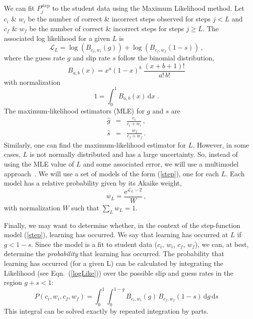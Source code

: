\documentclass[11pt,letterpaper]{article}
\begin{document}
%
We can fit $P_j^\mathrm{step} $ to the student data using the
Maximum Likelihood method.
Let $c_i$ \& $w_i$ be the number of correct \& incorrect steps observed
for steps $j<L$ and $c_f$ \& $w_f$ be the number of correct \& incorrect
steps for steps $j\ge L$.  The associated log likelihood for a given $L$ is
%
\begin{equation}
  \mathcal{L}_L  =  \log\left(B_{c_i,w_i}(g)\right) 
                  + \log\left(B_{c_f,w_f}(1-s) \right)  \, ,
		  \label{logLike}
\end{equation}
%
where the guess rate $g$ and slip rate $s$ follow the binomial distribution,
%
\begin{equation}
       B_{a,b}(x) = x^a (1-x)^b\; \frac{(x+b+1)!}{a!\, b!} 
\end{equation}
%
with normalization
%
\begin{equation}
      1=\int_0^1 B_{a,b}(x) \,\mathrm{d}x \; .
\end{equation} 
%
The maximum-likelihood estimators (MLE) for $g$ and $s$ are
%
\begin{eqnarray}
  \hat{g} &=&  \frac{c_i}{c_i+w_i} \, ,\\
  \hat{s} &=&  \frac{w_f}{c_f+w_f} \,  .
\end{eqnarray}
%
Similarly, one can find the maximum-likelihood estimator
for $L$.  However, in some cases, $L$ is not normally
distributed and has a large uncertainty.
So, instead of using the MLE value of $L$ and some
associated error, we will use a multimodel approach~\cite{aic-book}.
We will use a set of models of the form (\ref{step}), 
one for each $L$. Each model has a relative probability given 
by its Akaike weight,  
%
\begin{equation}
                   w_L = \frac{\mathrm{e}^{\mathcal{L}_L-2}}{W}\, ,
\end{equation}
%
with normalization $W$ such that $\sum_L w_L=1$.

%
Finally, we may want to determine whether, in the context
of the step-function model (\ref{step}), learning has occurred.
We say that learning has occurred at $L$ if $g<1-s$.
Since the model is a fit to student data ($c_i$, $w_i$, $c_f$, $w_f$), 
we can, at best, determine the {\em probability} that learning has occurred. 
The probability that learning has occurred (for a given L) 
can be calculated by integrating the Likelihood (see Eqn.~(\ref{logLike})) 
over the possible slip and guess rates in the region $g+s<1$:
%
\begin{equation}
   P(c_i, w_i, c_f, w_f)= \int_0^1 \int_0^{1-g} 
   B_{c_i,w_i}(g) \, B_{c_f,w_f}(1-s) \,\mathrm{d}g\,\mathrm{d}s
\end{equation}
%
This integral can be solved exactly by repeated integration by parts.
\end{document}
